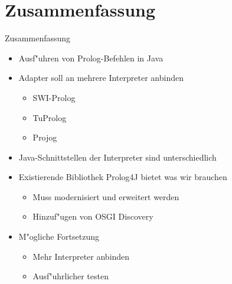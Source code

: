 \documentclass[18pt]{beamer}
\begin{document}
\section{Zusammenfassung}
\begin{frame}{Zusammenfassung}
\begin{itemize}
\item Ausf"uhren von Prolog-Befehlen in Java
\item Adapter soll an mehrere Interpreter anbinden
\begin{itemize}
\item SWI-Prolog
\item TuProlog
\item Projog
\end{itemize}
\item Java-Schnittstellen der Interpreter sind unterschiedlich
\item Existierende Bibliothek Prolog4J bietet was wir brauchen
\begin{itemize}
\item Muss modernisiert und erweitert werden
\item Hinzuf"ugen von OSGI Discovery
\end{itemize}
\item M"ogliche Fortsetzung
\begin{itemize}
\item Mehr Interpreter anbinden
\item Ausf"uhrlicher testen
\end{itemize}
\end{itemize}
\end{frame}
\end{document}
